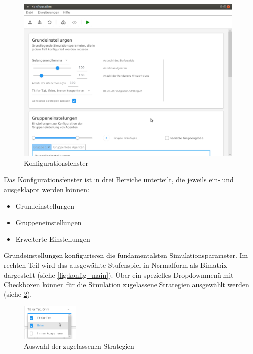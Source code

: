 \documentclass[parskip=full,11pt]{scrartcl}
\begin{document}
\begin{figure}[ht]
	\centering
	\includegraphics[width=\textwidth]{images/konfig.png}
	\caption{\label{fig:konfig}
		Konfigurationsfenster}
\end{figure} 

Das Konfigurationsfenster ist in drei Bereiche unterteilt, die jeweils ein- und ausgeklappt werden können:
\begin{itemize} \itemsep -10pt
	\item Grundeinstellungen
	\item Gruppeneinstellungen
	\item Erweiterte Einstellungen
\end{itemize}

Grundeinstellungen konfigurieren die fundamentalsten Simulationsparameter. Im rechten Teil wird das ausgewählte Stufenspiel in Normalform als Bimatrix dargestellt (siehe \cref{fig:konfig_main}). Über ein spezielles Dropdownmenü mit Checkboxen können für die Simulation zugelassene Strategien ausgewählt werden (siehe \cref{fig:konfig_strat_detail}).

\begin{figure}[ht]
	\centering
	\includegraphics[width=0.25\textwidth]{images/konfig_strat_detail.png}
	\caption{\label{fig:konfig_strat_detail}
		Auswahl der zugelassenen Strategien}
\end{figure}
\end{document}
